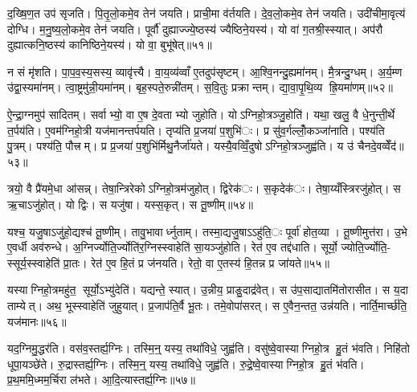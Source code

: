 
द॒ख्षि॒ण॒त उप॑ सृजति। पि॒तृ॒लो॒कमे॒व तेन॑ जयति। प्राची॒मा व॑र्तयति। दे॒व॒लो॒कमे॒व तेन॑ जयति। उदी॑चीमा॒वृत्य॑ दोग्धि। म॒नु॒ष्य॒लो॒कमे॒व तेन॑ जयति। पूर्वौ॑ दुह्याज्ज्ये॒ष्ठस्य॑ ज्यैष्ठिने॒यस्य॑। यो वा॑ ग॒तश्री॒स्स्यात्। अप॑रौ दुह्यात्कनि॒ष्ठस्य॑ कानिष्ठिने॒यस्य॑। यो वा॒ बुभू॑षेत्॥५१॥

न सं मृ॑शति। पा॒प॒व॒स्य॒सस्य॒ व्यावृ॑त्त्यै। वा॒य॒व्य॑व्वाँ ए॒तदुप॑सृष्टम्। आ॒श्वि॒नन्दु॒ह्यमा॑नम्। मै॒त्रन्दु॒ग्धम्। अ॒र्य॒म्ण उ॑द्वा॒स्यमा॑नम्। त्वा॒ष्ट्रमु॑न्नी॒यमा॑नम्। बृह॒स्पते॒रुन्नी॑तम्। स॒वि॒तुः प्रक्रान्तम्। द्या॒वा॒पृ॒थि॒व्य ह्रि॒यमा॑णम्॥५२॥

ऐ॒न्द्रा॒ग्नमुप॑ सादितम्। सर्वाभ्यो॒ वा ए॒ष दे॒वताभ्यो जुहोति। योऽग्निहो॒त्रञ्जु॒होति॑। यथा॒ खलु॒ वै धे॒नुन्ती॒र्थे त॒र्पय॑ति। ए॒वम॑ग्निहो॒त्री यज॑मानन्तर्पयति। तृप्य॑ति प्र॒जया॑ प॒शुभि॑ः। प्र सु॑व॒र्गल्लोँ॒कञ्जा॑नाति। पश्य॑ति पु॒त्रम्। पश्य॑ति॒ पौत्त्रम्। प्र प्र॒जया॑ प॒शुभि॑र्मिथु॒नैर्जा॑यते। यस्यै॒वव्विँ॒दुषोऽग्निहो॒त्रञ्जुह्व॑ति। य उ॑ चैनदे॒वव्वेँद॑॥५३॥


त्रयो॒ वै प्रै॑यमे॒धा आ॑सन्न्। तेषा॒न्त्रिरेकोऽग्निहो॒त्रम॑जुहोत्। द्विरेक॑ः। स॒कृदेक॑ः। तेषा॒य्यँस्त्रिरजु॑होत्। स ऋ॒चाऽजु॑होत्। यो द्विः। स यजु॑षा। यस्स॒कृत्। स तू॒ष्णीम्॥५४॥

यश्च॒ यजु॒षाऽजु॑हो॒द्यश्च॑ तू॒ष्णीम्। तावु॒भावार्ध्नुताम्। तस्मा॒द्यजु॒षाऽऽहु॑ति॒ः पूर्वा॑ होत॒व्या। तू॒ष्णीमुत्त॑रा। उ॒भे ए॒वर्धी अव॑रुन्धे। अ॒ग्निर्ज्योति॒र्ज्योति॑र॒ग्निस्स्वाहेति॑ सा॒यञ्जु॑होति। रेत॑ ए॒व तद्द॑धाति। सूर्यो॒ ज्योति॒र्ज्योति॒- स्सूर्य॒स्स्वाहेति॑ प्रा॒तः। रेत॑ ए॒व हि॒तं प्र ज॑नयति। रेतो॒ वा ए॒तस्य॑ हि॒तन्न प्र जा॑यते॥५५॥

यस्याग्निहो॒त्रमहु॑त॒ सूर्यो॒ऽभ्यु॑देति॑। यद्यन्ते॒ स्यात्। उ॒न्नीय॒ प्राङु॒दाद्र॑वेत्। स उ॑प॒साद्यातमि॑तोरासीत। स य॒दा ताम्येत्। अथ॒ भूस्स्वाहेति॑ जुहुयात्। प्र॒जाप॑ति॒र्वै भू॒तः। तमे॒वोपा॑सरत्। स ए॒वैन॒न्तत॒ उन्न॑यति। नार्ति॒मार्च्छ॑ति॒ यज॑मानः॥५६॥


यद॒ग्निमु॒द्धर॑ति। वस॑व॒स्तर्ह्य॒ग्निः। तस्मि॒न्॒ यस्य॒ तथा॑विधे॒ जुह्व॑ति। वसु॑ष्वे॒वास्याग्निहो॒त्र हु॒तं भ॑वति। निहि॑तो धूपा॒यञ्छे॑ते। रु॒द्रास्तर्ह्य॒ग्निः। तस्मि॒न्॒ यस्य॒ तथा॑विधे॒ जुह्व॑ति। रु॒द्रे॒ष्वे॒वास्याग्निहो॒त्र हु॒तं भ॑वति। प्र॒थ॒ममि॒ध्मम॒र्चिरा ल॑भते। आ॒दि॒त्यास्तर्ह्य॒ग्निः॥५७॥

